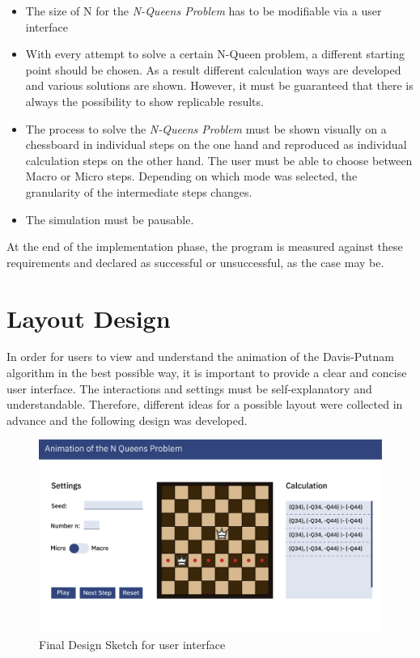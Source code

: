\begin{itemize}
  \item The size of N for the \textit{N-Queens Problem} has to be modifiable via a user interface
  \item With every attempt to solve a certain N-Queen problem, a different starting point should be chosen. As a result different calculation ways are developed and various solutions are shown. However, it must be guaranteed that there is always the possibility to show replicable results. 
  \item The process to solve the \textit{N-Queens Problem} must be shown visually on a chessboard in individual steps on the one hand and reproduced as individual calculation steps on the other hand. The user must be able to choose between Macro or Micro steps. Depending on which mode was selected, the granularity of the intermediate steps changes.
  \item The simulation must be pausable.
\end{itemize}

At the end of the implementation phase, the program is measured against these requirements and declared as successful or unsuccessful, as the case may be. 

\section{Layout Design}
\label{sec:conDesign}
In order for users to view and understand the animation of the Davis-Putnam algorithm in the best possible way, it is important to provide a clear and concise user interface. The interactions and settings must be self-explanatory and understandable. Therefore, different ideas for a possible layout were collected in advance and the following design was developed. 

\begin{figure}[h]
  \centering
  \includegraphics[width=\textwidth]{img/Design_N_Queens}
  \caption{Final Design Sketch for user interface}
  \label{fig:design}
\end{figure}

